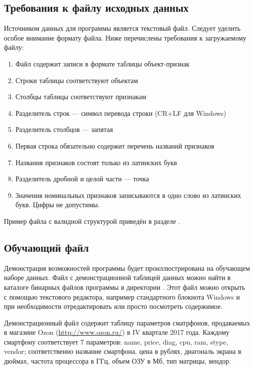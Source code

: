 \documentclass[12pt,tikz]{instruction}
\begin{document}
\subsection{Требования к файлу исходных данных}
\label{subsec:req}
Источником данных для программы является текстовый файл. Следует уделить особое внимание формату файла. Ниже перечислены требования к загружаемому файлу:
\begin{enumerate}
	\item Файл содержит записи в формате таблицы объект-признак
	\item Строки таблицы соответствуют объектам
	\item Столбцы таблицы соответствуют признакам
	\item Разделитель строк --- символ перевода строки (CR+LF для Windows)
	\item Разделитель столбцов --- запятая
	\item Первая строка обязательно содержит перечень названий признаков
	\item Названия признаков состоят только из латинских букв
	\item Разделитель дробной и целой части --- точка
	\item Значения номинальных признаков записываются в одно слово из латинских букв. Цифры не допустимы.
\end{enumerate}
Пример файла с  валидной структурой приведён в разделе .

\subsection{Обучающий файл}
\label{subsec:trainfile}

Демонстрация возможностей программы будет проиллюстрирована на обучающем наборе данных. Файл \SampleFile с демонстрационной таблицей данных можно найти в каталоге бинарных файлов программы в директории \DataCatalog. Этот файл можно открыть с помощью текстового редактора, например стандартного блокнота Windows и при необходимости отредактировать или просто посмотреть содержимое. 

Демонстрационный файл содержит таблицу параметров сматрфонов, продаваемых в магазине Ozon (\url{http://www.ozon.ru/}) в IV квартале 2017 года. Каждому смартфону соответствует 7 параметров: name, price, diag, cpu, ram, stype, vendor; соответственно название смартфона, цена в рублях, диагональ экрана в дюймах, частота процессора в ГГц, объем ОЗУ в Мб, тип матрицы, вендор.
\end{document}
